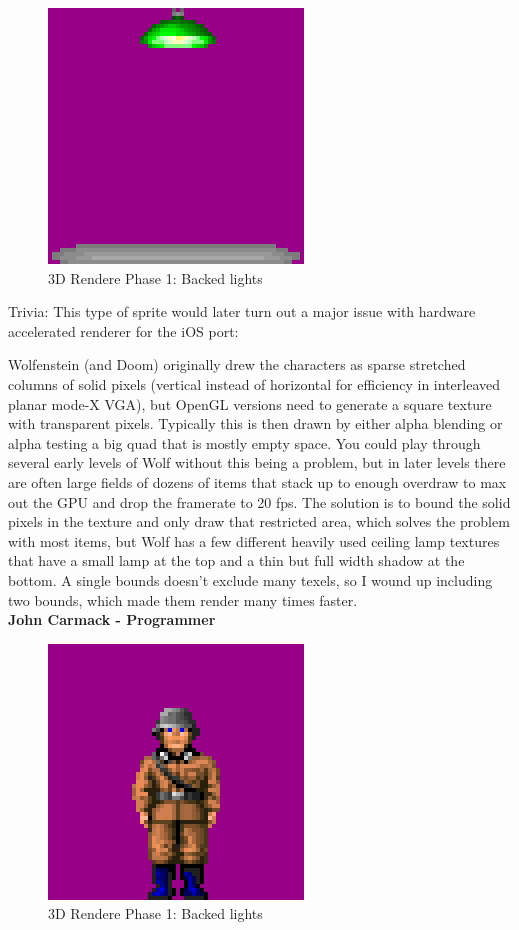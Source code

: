   \begin{figure}[H]
\centering
 \includegraphics[scale=1.3]{imgs/light_sprite.png}
 \caption{3D Rendere Phase 1: Backed lights} \label{fig:backee_lights}
 \end{figure}
Trivia: This type of sprite would later turn out a major issue with hardware accelerated renderer for the iOS port:

\begin{fancyquotes}
Wolfenstein (and Doom) originally drew the characters as sparse stretched columns of solid pixels (vertical instead of horizontal for efficiency in interleaved planar mode-X VGA), but OpenGL versions need to generate a square texture with transparent pixels.  Typically this is then drawn by either alpha blending or alpha testing a big quad that is mostly empty space.  You could play through several early levels of Wolf without this being a problem, but in later levels there are often large fields of dozens of items that stack up to enough overdraw to max out the GPU and drop the framerate to 20 fps.  The solution is to bound the solid pixels in the texture and only draw that restricted area, which solves the problem with most items, but Wolf has a few different heavily used ceiling lamp textures that have a small lamp at the top and a thin but full width shadow at the bottom.  A single bounds doesn't exclude many texels, so I wound up including two bounds, which made them render many times faster. 
\bigskip \\
\textbf{John Carmack - Programmer}
 \end{fancyquotes}

  \begin{figure}[H]
\centering
 \includegraphics[scale=1.3]{imgs/guard_sprite.png}
 \caption{3D Rendere Phase 1: Backed lights} \label{fig:backee_lights}
 \end{figure}



